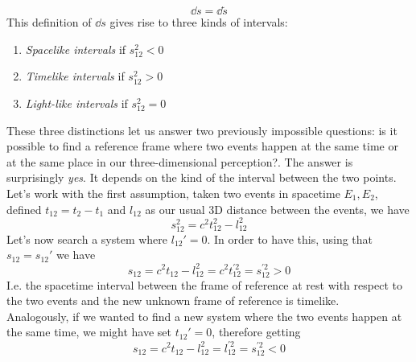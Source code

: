 \documentclass[../electromagnetism.tex]{subfiles}
\begin{document}
\begin{equation}
	\dd s=\dd\tilde{s}
	\label{eq:infsinv}
\end{equation}
This definition of $\dd s$ gives rise to three kinds of intervals:
\begin{enumerate}
\item \emph{Spacelike intervals} if $s_{12}^2<0$
\item \emph{Timelike intervals} if $s_{12}^2>0$
\item \emph{Light-like intervals} if $s_{12}^2=0$
\end{enumerate}
These three distinctions let us answer two previously impossible questions: is it possible to find a reference frame where two events happen at the same time or at the same place in our three-dimensional perception?. The answer is surprisingly \textit{yes}. It depends on the kind of the interval between the two points.\\
Let's work with the first assumption, taken two events in spacetime $E_1,E_2$, defined $t_{12}=t_2-t_1$ and $l_{12}$ as our usual 3D distance between the events, we have
\begin{equation*}
	s_{12}^2=c^2t_{12}^2-l^2_{12}
\end{equation*}
Let's now search a system where $l_{12}'=0$. In order to have this, using that $s_{12}=s_{12}'$ we have
\begin{equation*}
	s_{12}=c^2t_{12}-l^2_{12}=c^2t^{'2}_{12}=s_{12}^{'2}>0
\end{equation*}
I.e. the spacetime interval between the frame of reference at rest with respect to the two events and the new unknown frame of reference is timelike.\\
Analogously, if we wanted to find a new system where the two events happen at the same time, we might have set $t_{12}'=0$, therefore getting
\begin{equation}
	s_{12}=c^2t_{12}-l^2_{12}=l^{'2}_{12}=s_{12}^{'2}<0
	\label{eq:spacelike}
\end{equation}
\end{document}
